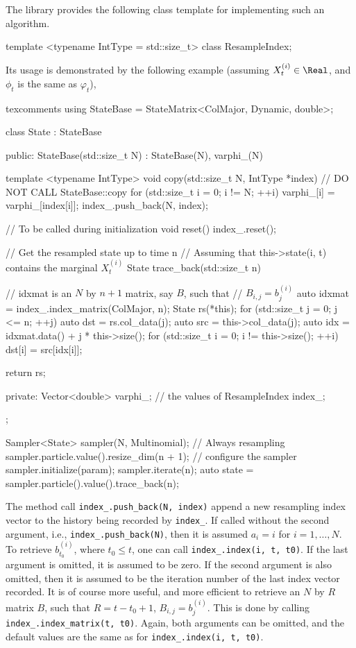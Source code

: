 The library provides the following class template for implementing such an
algorithm.
\begin{cppcode}
template <typename IntType = std::size_t>
class ResampleIndex;
\end{cppcode}
Its usage is demonstrated by the following example (assuming
$X_t^{(i)}\in\Real$, and $\phi_t$ is the same as $\varphi_t$),
\begin{cppcode*}{texcomments}
  using StateBase = StateMatrix<ColMajor, Dynamic, double>;

  class State : StateBase
  {
      public:
      StateBase(std::size_t N) : StateBase(N), varphi_(N) {}

      template <typename IntType>
      void copy(std::size_t N, IntType *index)
      {
          // DO NOT CALL StateBase::copy
          for (std::size_t i = 0; i != N; ++i)
              varphi_[i] = varphi_[index[i]];
          index_.push_back(N, index);
      }

      // To be called during initialization
      void reset() { index_.reset(); }

      // Get the resampled state up to time n
      // Assuming that this->state(i, t) contains the marginal $X_t^{(i)}$
      State trace_back(std::size_t n)
      {
          // idxmat is an $N$ by $n + 1$ matrix, say $B$, such that
          // $B_{i,j} = b_j^{(i)}$
          auto idxmat = index_.index_matrix(ColMajor, n);
          State rs(*this);
          for (std::size_t j = 0; j <= n; ++j) {
              auto dst = rs.col_data(j);
              auto src = this->col_data(j);
              auto idx = idxmat.data() + j * this->size();
              for (std::size_t i = 0; i != this->size(); ++i)
                  dst[i] = src[idx[i]];
          }

          return rs;
      }

      private:
      Vector<double> varphi_; // the values of 
      ResampleIndex index_;
  };

  Sampler<State> sampler(N, Multinomial); // Always resampling
  sampler.particle.value().resize_dim(n + 1);
  // configure the sampler
  sampler.initialize(param);
  sampler.iterate(n);
  auto state = sampler.particle().value().trace_back(n);
\end{cppcode*}
The method call \verb|index_.push_back(N, index)| append a new resampling index
vector to the history being recorded by \verb|index_|. If called without the
second argument, i.e., \verb|index_.push_back(N)|, then it is assumed $a_i = i$
for $i = 1,\dots,N$. To retrieve $b_{t_0}^{(i)}$, where $t_0 \le t$, one can
call \verb|index_.index(i, t, t0)|. If the last argument is omitted, it is
assumed to be zero. If the second argument is also omitted, then it is assumed
to be the iteration number of the last index vector recorded. It is of course
more useful, and more efficient to retrieve an $N$ by $R$ matrix $B$, such that
$R = t - t_0 + 1$, $B_{i,j} = b_j^{(i)}$. This is done by calling
\verb|index_.index_matrix(t, t0)|. Again, both arguments can be omitted, and
the default values are the same as for \verb|index_.index(i, t, t0)|.

